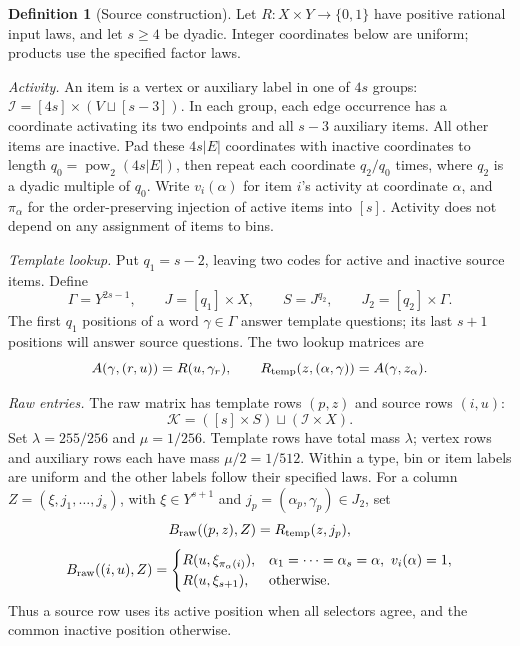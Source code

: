 \documentclass[11pt]{article} \usepackage[utf8]{inputenc}
\theoremstyle{plain} \newtheorem{theorem}{Theorem}[section]
\theoremstyle{definition} \newaliascnt{definition}{theorem}
\newtheorem{definition}[definition]{Definition} \aliascntresetthe{definition}
\begin{document}
\begin{definition}[Source construction]
\label{def:source-matrix}
Let \(R:X\times Y\to\{0,1\}\) have positive rational input laws, and let
\(s\ge4\) be dyadic. Integer coordinates below are uniform; products use
the specified factor laws.

\smallskip\noindent\textit{Activity.}
An item is a vertex or auxiliary label in one of \(4s\) groups:
\(\mathcal I=[4s]\times(V\sqcup[s-3])\).
In each group, each edge occurrence has a coordinate activating its two
endpoints and all \(s-3\) auxiliary items. All other items are inactive.
Pad these \(4s|E|\) coordinates with inactive coordinates to length
\(q_0=\operatorname{pow}_2(4s|E|)\), then repeat each coordinate
\(q_2/q_0\) times, where \(q_2\) is a dyadic multiple of \(q_0\).
Write \(v_i(\alpha)\) for item \(i\)'s activity at coordinate \(\alpha\),
and \(\pi_\alpha\) for the order-preserving injection of active items into
\([s]\). Activity does not depend on any assignment of items to bins.

\smallskip\noindent\textit{Template lookup.}
Put \(q_1=s-2\), leaving two codes for active and inactive source items.
Define
\[
\Gamma=Y^{2s-1},\qquad J=[q_1]\times X,\qquad S=J^{q_2},\qquad
J_2=[q_2]\times\Gamma.
\]
The first \(q_1\) positions of a word \(\gamma\in\Gamma\) answer
template questions; its last \(s+1\) positions will answer source questions.
The two lookup matrices are
\[
A(\gamma,(r,u))=R(u,\gamma_r),\qquad
R_{\rm temp}(z,(\alpha,\gamma))=A(\gamma,z_\alpha).
\]

\smallskip\noindent\textit{Raw entries.}
The raw matrix has template rows \((p,z)\) and source rows \((i,u)\):
\[
\mathcal K=([s]\times S)\sqcup(\mathcal I\times X).
\]
Set \(\lambda=255/256\) and \(\mu=1/256\).
Template rows have total mass \(\lambda\); vertex rows and auxiliary rows
each have mass \(\mu/2=1/512\). Within a type, bin or item labels are uniform
and the other labels follow their specified laws.
For a column \(Z=(\xi,j_1,\ldots,j_s)\), with \(\xi\in Y^{s+1}\) and
\(j_p=(\alpha_p,\gamma_p)\in J_2\), set
\[
B_{\rm raw}((p,z),Z)=R_{\rm temp}(z,j_p),
\]
\[
B_{\rm raw}((i,u),Z)=
 \begin{cases}
 R(u,\xi_{\pi_\alpha(i)}),
   &\alpha_1=\cdots=\alpha_s=\alpha,\ v_i(\alpha)=1,\\
 R(u,\xi_{s+1}),&\text{otherwise}.
 \end{cases}
\]
Thus a source row uses its active position when all selectors agree, and
the common inactive position otherwise.


\end{definition}
\end{document}
